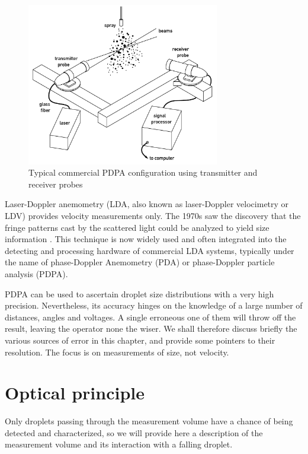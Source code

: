 \documentclass[11.5pt,oneside]{book}
\begin{document}
\begin{figure}
    \centering
    \includegraphics[width=0.75\textwidth]{img/setup/pdpa_setup.pdf}
    \caption{Typical commercial PDPA configuration using transmitter and
        receiver probes \label{fig:pdpa-setup}}
\end{figure}

Laser-Doppler anemometry (LDA, also known as laser-Doppler velocimetry or LDV)
provides velocity measurements only. The 1970s saw the discovery that the fringe
patterns cast by the scattered light could be analyzed to yield size information
\cite{Durst76, Wigley78}. This technique is now widely used and often
integrated into the detecting and processing hardware of commercial LDA systems,
typically under the name of phase-Doppler Anemometry (PDA) or phase-Doppler
particle analysis (PDPA).

PDPA can be used to ascertain droplet size distributions with a very high
precision. Nevertheless, its accuracy hinges on the knowledge of a large number
of distances, angles and voltages. A single erroneous one of them will throw
off the result, leaving the operator none the wiser. We shall therefore discuss
briefly the various sources of error in this chapter, and provide some pointers
to their resolution. The focus is on measurements of size, not velocity.

\section{Optical principle}
Only droplets passing through the measurement volume have a chance of being
detected and characterized, so we will provide here a description of the 
measurement volume and its interaction with a falling droplet.
\end{document}
